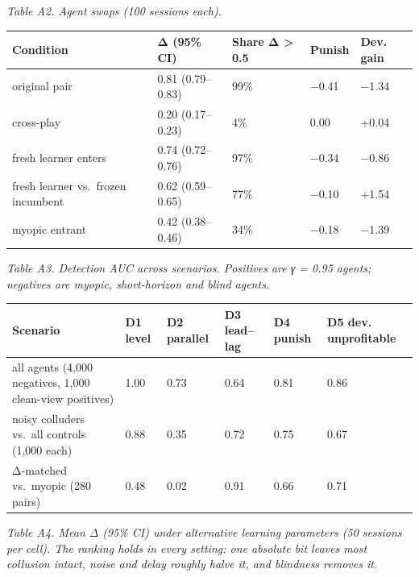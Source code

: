 \documentclass[11pt,a4paper]{article}
\begin{document}
\begingroup\small\noindent

\emph{Table A2. Agent swaps (100 sessions each).}

\endgroup

\begingroup\small
\begin{longtable}[]{@{}lllll@{}}
\toprule\noalign{}
Condition & Δ (95\% CI) & Share Δ \textgreater{} 0.5 & Punish & Dev. gain \\
\midrule\noalign{}
\endhead
\bottomrule\noalign{}
\endlastfoot
original pair & 0.81 (0.79--0.83) & 99\% & −0.41 & −1.34 \\
cross-play & 0.20 (0.17--0.23) & 4\% & 0.00 & +0.04 \\
fresh learner enters & 0.74 (0.72--0.76) & 97\% & −0.34 & −0.86 \\
fresh learner vs.~frozen incumbent & 0.62 (0.59--0.65) & 77\% & −0.10 & +1.54 \\
myopic entrant & 0.42 (0.38--0.46) & 34\% & −0.18 & −1.39 \\
\end{longtable}
\endgroup

\begingroup\small\noindent

\emph{Table A3. Detection AUC across scenarios. Positives are γ = 0.95 agents; negatives are myopic, short-horizon and blind agents.}

\endgroup

\begingroup\small
\begin{longtable}[]{@{}llllll@{}}
\toprule\noalign{}
Scenario & D1 level & D2 parallel & D3 lead--lag & D4 punish & D5 dev. unprofitable \\
\midrule\noalign{}
\endhead
\bottomrule\noalign{}
\endlastfoot
all agents (4,000 negatives, 1,000 clean-view positives) & 1.00 & 0.73 & 0.64 & 0.81 & 0.86 \\
noisy colluders vs.~all controls (1,000 each) & 0.88 & 0.35 & 0.72 & 0.75 & 0.67 \\
Δ-matched vs.~myopic (280 pairs) & 0.48 & 0.02 & 0.91 & 0.66 & 0.71 \\
\end{longtable}
\endgroup

\begingroup\small\noindent

\emph{Table A4. Mean Δ (95\% CI) under alternative learning parameters (50 sessions per cell). The ranking holds in every setting: one absolute bit leaves most collusion intact, noise and delay roughly halve it, and blindness removes it.}

\endgroup
\end{document}
